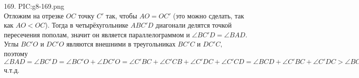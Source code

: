 169. {{PIC:g8-169.png}}\\
Отложим на отрезке $OC$ точку $C'$ так, чтобы $AO=OC'$ (это можно сделать, так как $AO<OC$). Тогда в четырёхугольнике $ABC'D$ диагонали делятся точкой пересечения пополам, значит он является параллелограммом и $\angle BC'D=\angle BAD.$ Углы $BC'O$ и $DC'O$ являются внешними в треугольниках $BC'C$ и $DC'C,$ поэтому $\angle BAD=\angle BC'D=\angle BC'O+\angle DC'O=\angle C'BC+\angle C'CB+\angle C'DC+\angle C'CD=\angle BCD+\angle C'BC+\angle C'DC>\angle BCD,$ ч.т.д.\\
